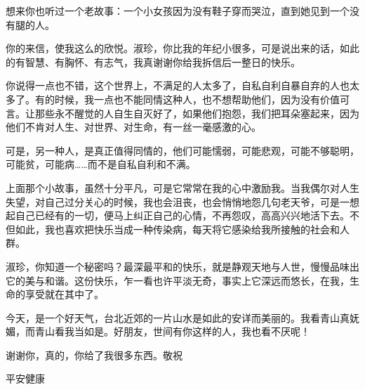 
\par {}
\par 想来你也听过一个老故事：一个小女孩因为没有鞋子穿而哭泣，直到她见到一个没有腿的人。
\par 你的来信，使我这么的欣悦。淑珍，你比我的年纪小很多，可是说出来的话，如此的有智慧、有胸怀、有志气，我真谢谢你给我拆信后一整日的快乐。
\par 你说得一点也不错，这个世界上，不满足的人太多了，自私自利自暴自弃的人也太多了。有的时候，我一点也不能同情这种人，也不想帮助他们，因为没有价值可言。让那些永不醒觉的人自生自灭好了，如果他们抱怨，我们把耳朵塞起来，因为他们不肯对人生、对世界、对生命，有一丝一毫感激的心。
\par 可是，另一种人，是真正值得同情的，他们可能懦弱，可能悲观，可能不够聪明，可能贫，可能病……而不是自私自利和不满。
\par 上面那个小故事，虽然十分平凡，可是它常常在我的心中激励我。当我偶尔对人生失望，对自己过分关心的时候，我也会沮丧，也会悄悄地怨几句老天爷，可是一想起自己已经有的一切，便马上纠正自己的心情，不再怨叹，高高兴兴地活下去。不但如此，我也喜欢把快乐当成一种传染病，每天将它感染给我所接触的社会和人群。
\par 淑珍，你知道一个秘密吗？最深最平和的快乐，就是静观天地与人世，慢慢品味出它的美与和谐。这份快乐，乍一看也许平淡无奇，事实上它深远而悠长，在我，生命的享受就在其中了。
\par 今天，是一个好天气，台北近郊的一片山水是如此的安详而美丽的。我看青山真妩媚，而青山看我当如是。好朋友，世间有你这样的人，我也看不厌呢！
\par 谢谢你，真的，你给了我很多东西。敬祝
\par 平安健康
\par {}
\par {}


